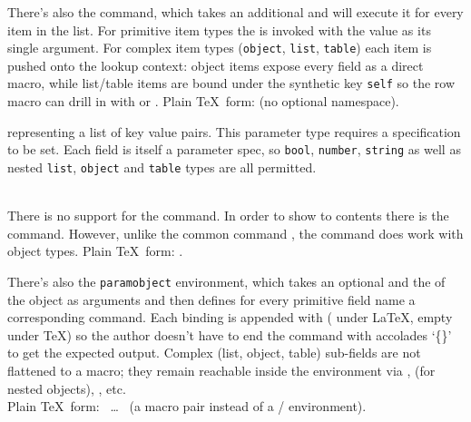 \documentclass{ltxdoc}
\newcommand\showexample[5][15pt]{%
\begin{minipage}[t]{.5\linewidth - .5 \columnsep}%

\end{minipage}\hspace*{\columnsep}%
\begin{minipage}[t]{.5\linewidth - .5 \columnsep}%

\end{minipage}\\%
}
\begin{document}
\begin{description}
        \DescribeMacro{\forlistitem}
        There's also the \cmd{\forlistitem} command, which takes an additional  and will execute it for every item in the list.
        For primitive item types the  is invoked with the value as its single argument.
        For complex item types (\texttt{object}, \texttt{list}, \texttt{table}) each item is pushed onto the lookup context: object items expose every field as a direct  macro, while list/table items are bound under the synthetic key \texttt{self} so the row macro can drill in with \cmd{\fortablerow} or \cmd{\forlistitem}.
        Plain \TeX\ form: \cmd{\forlistitem} (no optional namespace).
        \item[object] representing a list of key value pairs.
        This parameter type requires a  specification to be set.
        Each field is itself a parameter spec, so \texttt{bool}, \texttt{number}, \texttt{string} as well as nested \texttt{list}, \texttt{object} and \texttt{table} types are all permitted.\\
        \showexample{19}{19-30}{8}{8-11}
        There is no support for the \cmd{\param} command.
        \DescribeMacro{\paramfield}
        In order to show to contents there is the \cmd{\paramfield} command.
        However, unlike the common command \cmd{\param}, the command \cmd{\hasparam} does work with object types.
        Plain \TeX\ form: \cmd{\paramfield}.

         There's also the \texttt{paramobject} environment, which takes an optional  and the  of the object as arguments and then defines for every primitive field name a corresponding command.
        Each binding is appended with \cmd{\paramfieldterm} (\cmd{\xspace} under \LaTeX, empty under \TeX) so the author doesn't have to end the command with accolades `\{\}' to get the expected output.
        Complex (list, object, table) sub-fields are not flattened to a macro; they remain reachable inside the environment via \cmd{\forlistitem}, \cmd{\paramfield} (for nested objects), \cmd{\fortablerow}, etc.\\
        Plain \TeX\ form: \cmd{\paramobject}~\dots~\cmd{\endparamobject} (a macro pair instead of a \cmd{\begin}/\cmd{\end} environment).


\end{description}
\end{document}
